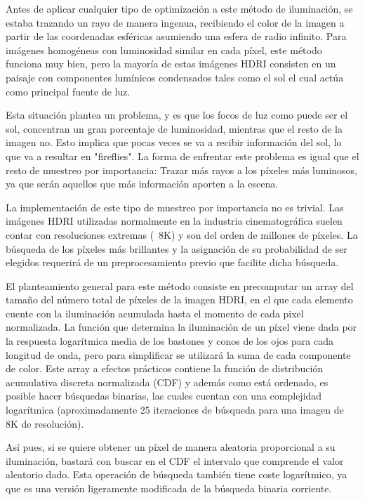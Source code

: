Antes de aplicar cualquier tipo de optimización a este método de iluminación, se estaba trazando un rayo de manera ingenua, recibiendo el color de la imagen a partir de las coordenadas esféricas asumiendo una esfera de radio infinito. Para imágenes homogéneas con luminosidad similar en cada píxel, este método funciona muy bien, pero la mayoría de estas imágenes HDRI consisten en un paisaje con componentes lumínicos condensados tales como el sol el cual actúa como principal fuente de luz.

Esta situación plantea un problema, y es que los focos de luz como puede ser el sol, concentran un gran porcentaje de luminosidad, mientras que el resto de la imagen no. Esto implica que pocas veces se va a recibir información del sol, lo que va a resultar en "fireflies". La forma de enfrentar este problema es igual que el resto de muestreo por importancia: Trazar más rayos a los píxeles más luminosos, ya que serán aquellos que más información aporten a la escena.

La implementación de este tipo de muestreo por importancia no es trivial. Las imágenes HDRI utilizadas normalmente en la industria cinematográfica suelen contar con resoluciones extremas (~8K) y son del orden de millones de píxeles. La búsqueda de los píxeles más brillantes y la asignación de su probabilidad de ser elegidos requerirá de un preprocesamiento previo que facilite dicha búsqueda.

El planteamiento general para este método consiste en precomputar un array del tamaño del número total de píxeles de la imagen HDRI, en el que cada elemento cuente con la iluminación acumulada hasta el momento de cada pixel normalizada.
La función que determina la iluminación de un píxel viene dada por la respuesta logarítmica media de los bastones y conos de los ojos para cada longitud de onda, pero para simplificar se utilizará la suma de cada componente de color. Este array a efectos prácticos contiene la función de distribución acumulativa discreta normalizada (CDF) y además como está ordenado, es posible hacer búsquedas binarias, las cuales cuentan con una complejidad logarítmica (aproximadamente 25 iteraciones de búsqueda para una imagen de 8K de resolución).



Así pues, si se quiere obtener un píxel de manera aleatoria proporcional a su iluminación, bastará con buscar en el CDF el intervalo que comprende el valor aleatorio dado. Esta operación de búsqueda también tiene coste logarítmico, ya que es una versión ligeramente modificada de la búsqueda binaria corriente.

